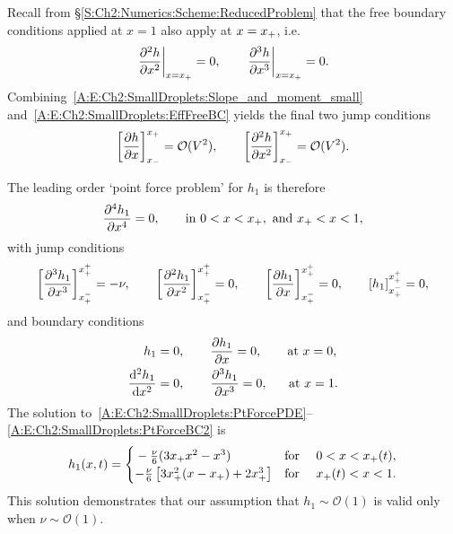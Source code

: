 \begin{subappendices}
Recall from \S\ref{S:Ch2:Numerics:Scheme:ReducedProblem} that the free boundary conditions applied at $x = 1$ also apply at $x = x_{+}$, i.e.
\begin{equation}\label{A:E:Ch2:SmallDroplets:EffFreeBC}{\left.\frac{\partial ^2 h}{\partial x^2}\right|_{x = x_{+}} = 0, \qquad \left.\frac{\partial ^3 h}{\partial x^3}\right|_{x = x_{+}} =0.}
\end{equation}
Combining~\eqref{A:E:Ch2:SmallDroplets:Slope_and_moment_small} and~\eqref{A:E:Ch2:SmallDroplets:EffFreeBC} yields the final two jump conditions
\begin{equation}\label{A:E:Ch2:SmallDroplets:Slope_and_moment_jump_conds}
\left[\frac{\partial h}{\partial x}\right]_{x_{-}}^{x_{+}} = \mathcal{O}(V^2), \qquad \left[\frac{\partial ^2 h}{\partial x^2}\right]_{x_{-}}^{x_{+}} = \mathcal{O}(V^2).
\end{equation}

The leading order `point force problem' for $h_1$ is therefore
\begin{equation}\label{A:E:Ch2:SmallDroplets:PtForcePDE}
\frac{\partial ^4 h_1}{\partial x^4} = 0, \qquad \text{in}~0< x < x_{+},~\text{and}~x_{+} < x < 1,
\end{equation}
with jump conditions
\begin{equation}\label{A:E:Ch2:SmallDroplets:PtForceJump}
\left[\frac{\partial ^3 h_1}{\partial x^3}\right]_{x_{+}^-}^{x_{+}^+} = -\nu, \qquad \left[\frac{\partial ^2 h_1}{\partial x^2}\right]_{x_{+}^-}^{x_{+}^+} =0, \qquad \left[\frac{\partial  h_1}{\partial x}\right]_{x_{+}^-}^{x_{+}^+} =0,\qquad \left[h_1\right]_{x_{+}^-}^{x_{+}^+} = 0,
\end{equation}
and boundary conditions
\begin{align}
h_1 &= 0, \qquad  \frac{\partial h_1}{\partial x}= 0, \qquad\text{at}~x = 0,\label{A:E:Ch2:SmallDroplets:PtForceBC1}\\
\frac{\mathrm{d} ^2 h_1}{\mathrm{d} x^2} &= 0, \qquad \frac{\partial ^3 h_1}{\partial x^3}= 0, ~~\quad \text{at}~x = 1.\label{A:E:Ch2:SmallDroplets:PtForceBC2}
\end{align}
The solution to~\eqref{A:E:Ch2:SmallDroplets:PtForcePDE}--\eqref{A:E:Ch2:SmallDroplets:PtForceBC2} is
\begin{equation}\label{A:E:Ch2:SmallDroplets:SolutionShape}
h_1(x,t) = \begin{cases}{}
        -\frac{\nu}{6}(3x_{+} x^2 - x^3) & \text{for }\quad 0 < x < x_{+}(t), \\
       -\frac{\nu}{6}\left[3x_{+}^2(x - x_{+}) + 2 x_{+}^3\right] & \text{for }\quad x_{+}(t) < x < 1.
        \end{cases}
\end{equation}
This solution demonstrates that our assumption that $h_1\sim \mathcal{O}(1)$ is valid only when $\nu  \sim \mathcal{O}(1)$.


\end{subappendices}
